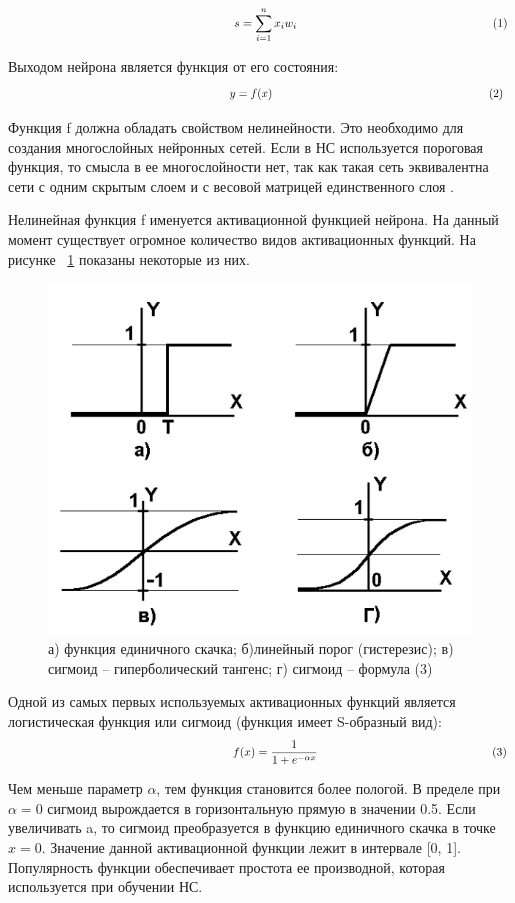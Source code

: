 \documentclass[a4paper,english,russian]{G2-105}
\begin{document}
\[
\ \hspace*{66mm} s = \sum_{i=1}^n x_i w_i \hspace*{59mm} (1)
\] 
\par Выходом нейрона является функция от его состояния:
\[
\ \hspace*{66mm} y = f(x) \hspace*{68mm} (2)
\] 
\par Функция f должна обладать свойством нелинейности. Это необходимо для создания многослойных нейронных сетей. Если в НС используется пороговая функция, то смысла в ее многослойности нет, так как такая сеть эквивалентна сети с одним скрытым слоем и с весовой матрицей единственного слоя \cite{11}. 
\par Нелинейная функция f именуется активационной функцией нейрона. На данный момент существует огромное количество видов активационных функций. На рисунке ~\ref{activation_func} показаны некоторые из них.
\begin{figure}
\begin{center}
    \includegraphics[width=0.6\linewidth]{activation_func.png}
    \caption{а) функция единичного скачка; б)линейный порог (гистерезис); в) сигмоид – гиперболический тангенс; г) сигмоид – формула (3)}
	\label{activation_func}
\end{center}
\end{figure}
\par Одной из самых первых используемых активационных функций является логистическая функция или сигмоид (функция имеет S-образный вид): 
\[
\ \hspace*{66mm} f(x) = \frac{1}{1 + e^{- \alpha x}}\ \hspace*{52mm} (3)
\] 
\par Чем меньше параметр $\alpha$, тем функция становится более пологой. В пределе при $\alpha=0$ сигмоид вырождается в горизонтальную прямую в значении 0.5. Если увеличивать a, то сигмоид преобразуется в функцию единичного скачка в точке $x=0$. Значение данной активационной функции лежит в интервале [0, 1]. Популярность функции обеспечивает простота ее производной, которая используется при обучении НС. 
\end{document}
